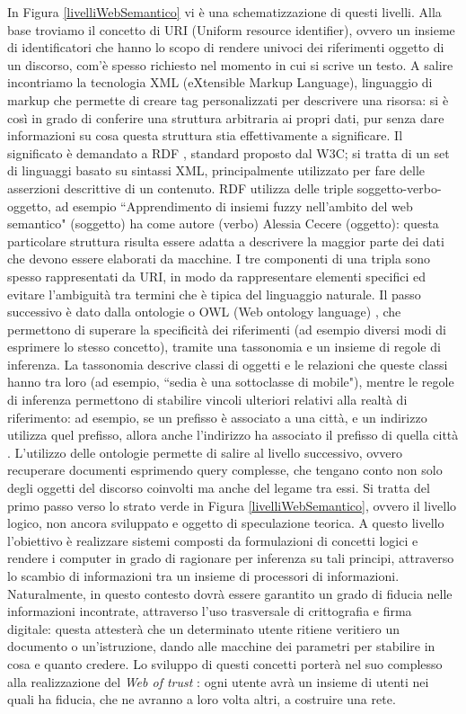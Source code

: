\documentclass[12pt,a4paper]{report}
\begin{document}
In Figura \ref{livelliWebSemantico} vi è una schematizzazione di questi livelli. 
Alla base troviamo il concetto di URI (Uniform resource identifier), ovvero un insieme di identificatori che hanno lo scopo di rendere univoci dei riferimenti oggetto di un discorso, com'è spesso richiesto nel momento in cui si scrive un testo.
A salire incontriamo la tecnologia XML \cite{semanticWebPage} (eXtensible Markup Language), linguaggio di markup che permette di creare tag personalizzati per descrivere una risorsa: si è così in grado di conferire una struttura arbitraria ai propri dati, pur senza dare informazioni su cosa questa struttura stia effettivamente a significare.
Il significato è demandato a RDF \cite{semanticWebPage}, standard proposto dal W3C; si tratta di un set di linguaggi basato su sintassi XML, principalmente utilizzato per fare delle asserzioni descrittive di un contenuto. RDF utilizza delle triple soggetto-verbo-oggetto, ad esempio ``Apprendimento di insiemi fuzzy nell'ambito del web semantico" (soggetto) ha come autore (verbo) Alessia Cecere (oggetto): questa particolare struttura risulta essere adatta a descrivere la maggior parte dei dati che devono essere elaborati da macchine.
I tre componenti di una tripla sono spesso rappresentati da URI, in modo da rappresentare elementi specifici ed evitare l'ambiguità tra termini che è tipica del linguaggio naturale.
Il passo successivo è dato dalla ontologie o OWL (Web ontology language) \cite{semanticWebPage}, che permettono di superare la specificità dei riferimenti (ad esempio diversi modi di esprimere lo stesso concetto), tramite una tassonomia e un insieme di regole di inferenza. La tassonomia descrive classi di oggetti e le relazioni che queste classi hanno tra loro (ad esempio, ``sedia è una sottoclasse di mobile"), mentre le regole di inferenza permettono di stabilire vincoli ulteriori relativi alla realtà di riferimento: ad esempio, se un prefisso è associato a una città, e un indirizzo utilizza quel prefisso, allora anche l'indirizzo ha associato il prefisso di quella città \cite{semanticWebPaper}. 
L'utilizzo delle ontologie permette di salire al livello successivo, ovvero recuperare documenti esprimendo query complesse, che tengano conto non solo degli oggetti del discorso coinvolti ma anche del legame tra essi.
Si tratta del primo passo verso lo strato verde in Figura \ref{livelliWebSemantico}, ovvero il livello logico, non ancora sviluppato e oggetto di speculazione teorica. A questo livello l'obiettivo è realizzare sistemi composti da formulazioni di concetti logici e rendere i computer in grado di ragionare per inferenza su tali principi, attraverso lo scambio di informazioni tra un insieme di processori di informazioni. Naturalmente, in questo contesto dovrà essere garantito un grado di fiducia nelle informazioni incontrate, attraverso l'uso trasversale di crittografia e firma digitale: questa attesterà che un determinato utente ritiene veritiero un documento o un'istruzione, dando alle macchine dei parametri per stabilire in cosa e quanto credere.
Lo sviluppo di questi concetti porterà nel suo complesso alla realizzazione del \emph{Web of trust} \cite{semanticWebPage}: ogni utente avrà un insieme di utenti nei quali ha fiducia, che ne avranno a loro volta altri, a costruire una rete.
\end{document}
